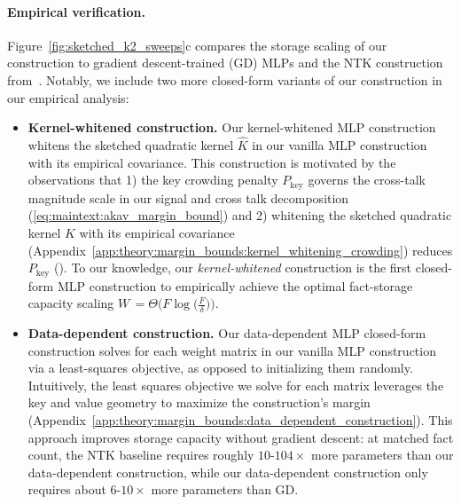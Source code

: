 \paragraph{Empirical verification.}
Figure~\ref{fig:sketched_k2_sweeps}c compares the storage scaling of our construction to gradient descent-trained (GD) MLPs and the NTK construction from~\citet{nichani2024understandingfactualrecalltransformers}. Notably, we include two more closed-form variants of our construction in our empirical analysis:
\begin{itemize}[leftmargin=0.5cm]
    \label{kernel-whitened-construction}
    \item \textbf{Kernel-whitened construction.} Our kernel-whitened MLP construction whitens the sketched quadratic kernel $\hat{K}$ in our vanilla MLP construction with its empirical covariance. This construction is motivated by the observations that 1) the key crowding penalty $P_{\mathrm{key}}$ governs the cross-talk magnitude scale in our signal and cross talk decomposition (\cref{eq:maintext:akav_margin_bound}) and 2) whitening the sketched quadratic kernel $\hat{K}$ with its empirical covariance (Appendix~\ref{app:theory:margin_bounds:kernel_whitening_crowding}) reduces $P_{\mathrm{key}}$ (). To our knowledge, our \emph{kernel-whitened} construction is the first closed-form MLP construction to empirically achieve the optimal fact-storage capacity scaling $W \,= \Theta\Big(F\log\!\Big(\frac{F}{\delta}\Big)\Big)$.
    \label{data-dependent-construction}
    \item \textbf{Data-dependent construction.} Our data-dependent MLP closed-form construction solves for each weight matrix in our vanilla MLP construction via a least-squares objective, as opposed to initializing them randomly. Intuitively, the least squares objective we solve for each matrix leverages the key and value geometry to maximize the construction's margin (Appendix~\ref{app:theory:margin_bounds:data_dependent_construction}). This approach improves storage capacity without gradient descent: at matched fact count, the NTK baseline requires roughly $10$-$104\times$ more parameters than our data-dependent construction, while our data-dependent construction only requires about $6$-$10\times$ more parameters than GD.
\end{itemize}




